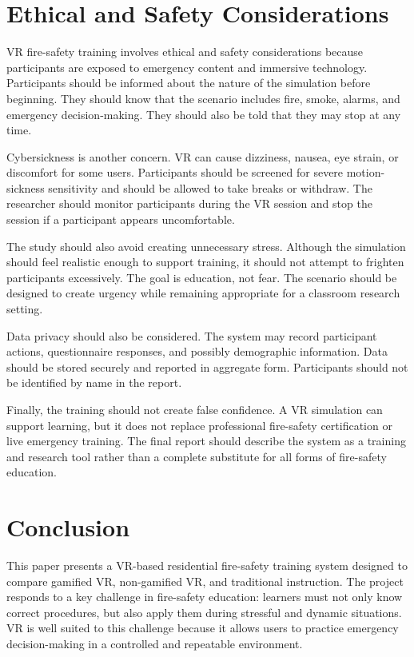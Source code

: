 \documentclass[manuscript, review]{acmart}
\begin{document}
{\section{Ethical and Safety Considerations}
\label{sec:ethics}

VR fire-safety training involves ethical and safety considerations because participants are exposed to emergency content and immersive technology. Participants should be informed about the nature of the simulation before beginning. They should know that the scenario includes fire, smoke, alarms, and emergency decision-making. They should also be told that they may stop at any time.

Cybersickness is another concern. VR can cause dizziness, nausea, eye strain, or discomfort for some users. Participants should be screened for severe motion-sickness sensitivity and should be allowed to take breaks or withdraw. The researcher should monitor participants during the VR session and stop the session if a participant appears uncomfortable.

The study should also avoid creating unnecessary stress. Although the simulation should feel realistic enough to support training, it should not attempt to frighten participants excessively. The goal is education, not fear. The scenario should be designed to create urgency while remaining appropriate for a classroom research setting.

Data privacy should also be considered. The system may record participant actions, questionnaire responses, and possibly demographic information. Data should be stored securely and reported in aggregate form. Participants should not be identified by name in the report.

Finally, the training should not create false confidence. A VR simulation can support learning, but it does not replace professional fire-safety certification or live emergency training. The final report should describe the system as a training and research tool rather than a complete substitute for all forms of fire-safety education.

\section{Conclusion}
\label{sec:conclusion}

This paper presents a VR-based residential fire-safety training system designed to compare gamified VR, non-gamified VR, and traditional instruction. The project responds to a key challenge in fire-safety education: learners must not only know correct procedures, but also apply them during stressful and dynamic situations. VR is well suited to this challenge because it allows users to practice emergency decision-making in a controlled and repeatable environment.

}
\end{document}
